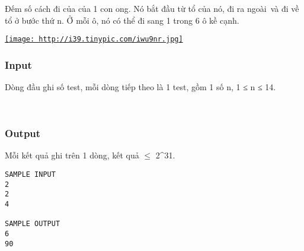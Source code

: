

Đếm số cách đi của của 1 con ong. Nó bắt đầu từ tổ của nó, đi ra ngoài và đi về tổ ở bước thứ n. Ở mỗi ô, nó có thể đi sang 1 trong 6 ô kề cạnh.

\href{http://tinypic.com}{
\texttt{[image: http://i39.tinypic.com/iwu9nr.jpg]}}

\subsubsection{Input}

Dòng đầu ghi số test, mỗi dòng tiếp theo là 1 test, gồm 1 số n, 1 ≤ n ≤ 14.

 

\subsubsection{Output}

Mỗi kết quả ghi trên 1 dòng, kết quả  $\le$  2^31.
\begin{verbatim}
SAMPLE INPUT
2
2
4

SAMPLE OUTPUT
6
90
\end{verbatim}

